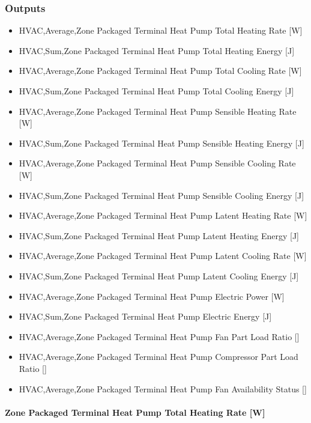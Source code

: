 \subsubsection{Outputs}\label{outputs-8-009}

\begin{itemize}
\item
  HVAC,Average,Zone Packaged Terminal Heat Pump Total Heating Rate {[}W{]}
\item
  HVAC,Sum,Zone Packaged Terminal Heat Pump Total Heating Energy {[}J{]}
\item
  HVAC,Average,Zone Packaged Terminal Heat Pump Total Cooling Rate {[}W{]}
\item
  HVAC,Sum,Zone Packaged Terminal Heat Pump Total Cooling Energy {[}J{]}
\item
  HVAC,Average,Zone Packaged Terminal Heat Pump Sensible Heating Rate {[}W{]}
\item
  HVAC,Sum,Zone Packaged Terminal Heat Pump Sensible Heating Energy {[}J{]}
\item
  HVAC,Average,Zone Packaged Terminal Heat Pump Sensible Cooling Rate {[}W{]}
\item
  HVAC,Sum,Zone Packaged Terminal Heat Pump Sensible Cooling Energy {[}J{]}
\item
  HVAC,Average,Zone Packaged Terminal Heat Pump Latent Heating Rate {[}W{]}
\item
  HVAC,Sum,Zone Packaged Terminal Heat Pump Latent Heating Energy {[}J{]}
\item
  HVAC,Average,Zone Packaged Terminal Heat Pump Latent Cooling Rate {[}W{]}
\item
  HVAC,Sum,Zone Packaged Terminal Heat Pump Latent Cooling Energy {[}J{]}
\item
  HVAC,Average,Zone Packaged Terminal Heat Pump Electric Power {[}W{]}
\item
  HVAC,Sum,Zone Packaged Terminal Heat Pump Electric Energy {[}J{]}
\item
  HVAC,Average,Zone Packaged Terminal Heat Pump Fan Part Load Ratio {[]}
\item
  HVAC,Average,Zone Packaged Terminal Heat Pump Compressor Part Load Ratio {[]}
\item
  HVAC,Average,Zone Packaged Terminal Heat Pump Fan Availability Status {[]}
\end{itemize}

\paragraph{Zone Packaged Terminal Heat Pump Total Heating Rate {[}W{]}}\label{zone-packaged-terminal-heat-pump-total-heating-rate-w}

